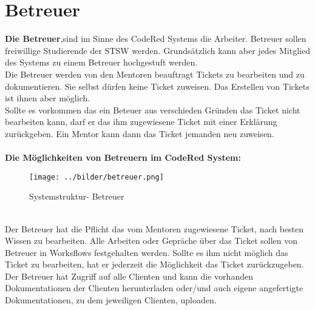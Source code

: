\chapter{Betreuer}  %
\label{chapter:Betreuer}  %

\textbf{Die Betreuer},sind im Sinne des CodeRed Systems die Arbeiter. Betreuer sollen freiwillige Studierende der STSW werden. Grundsätzlich kann aber jedes Mitglied des Systems zu einem Betreuer hochgestuft werden.\\
Die Betreuer werden von den Mentoren beauftragt Tickets zu bearbeiten und zu dokumentieren. Sie selbst dürfen  keine Ticket zuweisen. Das Erstellen von Tickets ist ihnen aber möglich. \\
Sollte es vorkommen das ein Beteuer aus verschieden Gründen das Ticket nicht bearbeiten kann, darf er das ihm zugewiesene Ticket mit einer Erklärung zurückgeben. Ein Mentor kann dann das Ticket jemanden neu zuweisen. 
\\
\\
\textbf{Die Möglichkeiten von Betreuern im CodeRed System:}
\begin{figure}[h]
\begin{center}
   \texttt{[image: ../bilder/betreuer.png]}
   \caption{Systemstruktur- Betreuer}
   \label{Systemstruktur - Betreuer}
\end{center}
\end{figure}
\\
Der Betreuer hat die Pflicht das vom Mentoren zugewiesene Ticket, nach besten Wissen zu bearbeiten. Alle Arbeiten oder Gepräche über das Ticket sollen von Betreuer in Worksflows festgehalten werden. Sollte es ihm nicht möglich das Ticket zu bearbeiten, hat er jederzeit die Möglichkeit das Ticket zurückzugeben. Der Betreuer hat Zugriff auf alle Clienten und kann die vorhanden Dokumentationen der Clienten herunterladen oder/und auch eigene angefertigte Dokumentationen, zu dem jeweiligen Clienten, uploaden.

